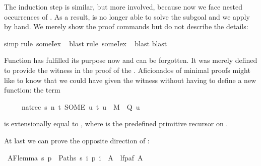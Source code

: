 \begin{isabellebody}
\begin{isamarkuptxt}
The induction step is similar, but more involved, because now we face nested
occurrences of . As a result,  is no longer able to
solve the subgoal and we apply  by hand.  We merely
show the proof commands but do not describe the details:%
\end{isamarkuptxt}%
\isamarkuptrue%
simp{\isacharparenright}\isanewline
\isamarkupfalse%
rule\ someI{}{\isacharunderscore}ex{\isacharparenright}\isanewline
\ \isamarkupfalse%
blast{\isacharparenright}\isanewline
\isamarkupfalse%
rule\ someI{}{\isacharunderscore}ex{\isacharparenright}\isanewline
\ \isamarkupfalse%
blast{\isacharparenright}\isanewline
\isamarkupfalse%
blast{\isacharparenright}\isanewline
\isamarkupfalse%
\isamarkupfalse%
%
\begin{isamarkuptext}%
Function  has fulfilled its purpose now and can be forgotten.
It was merely defined to provide the witness in the proof of the
. Aficionados of minimal proofs might like to know
that we could have given the witness without having to define a new function:
the term
\begin{isabelle}%
\ \ \ \ \ nat{\isacharunderscore}rec\ s\ {\isacharparenleft}{\isasymlambda}n\ t{\isachardot}\ SOME\ u{\isachardot}\ {\isacharparenleft}t{\isacharcomma}\ u{\isacharparenright}\ {\isasymin}\ M\ {\isasymand}\ Q\ u{\isacharparenright}%
\end{isabelle}
is extensionally equal to ,
where  is the predefined primitive recursor on .%
\end{isamarkuptext}%
\isamarkuptrue%
\isamarkupfalse%
\isamarkupfalse%
\isamarkupfalse%
\isamarkupfalse%
\isamarkupfalse%
\isamarkupfalse%
\isamarkupfalse%
\isamarkupfalse%
\isamarkupfalse%
\isamarkupfalse%
\isamarkupfalse%
\isamarkupfalse%
\isamarkupfalse%
\isamarkupfalse%
\isamarkupfalse%
\isamarkupfalse%
%
\begin{isamarkuptext}%
At last we can prove the opposite direction of :%
\end{isamarkuptext}%
\isamarkuptrue%
\ AF{\isacharunderscore}lemma{}{\isacharcolon}\ {\isachardoublequote}{\isacharbraceleft}s{\isachardot}\ {\isasymforall}p\ {\isasymin}\ Paths\ s{\isachardot}\ {\isasymexists}i{\isachardot}\ p\ i\ {\isasymin}\ A{\isacharbraceright}\ {\isasymsubseteq}\ lfp{\isacharparenleft}af\ A{\isacharparenright}{\isachardoublequote}\isamarkupfalse%

\end{isabellebody}
